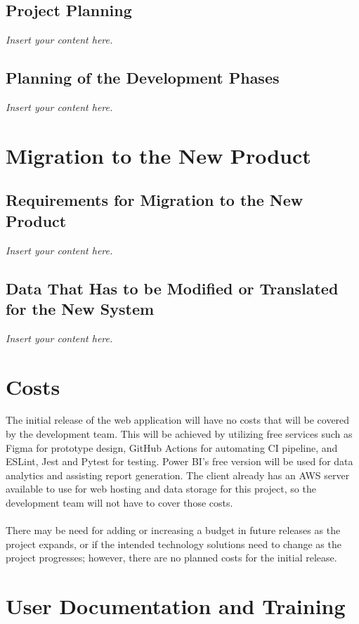 \documentclass[12pt]{article}
\newcommand{\lips}{\textit{Insert your content here.}}
\begin{document}
\subsection{Project Planning}
\lips
\subsection{Planning of the Development Phases}
\lips

\section{Migration to the New Product}
\subsection{Requirements for Migration to the New Product}
\lips
\subsection{Data That Has to be Modified or Translated for the New System}
\lips

\section{Costs}
\hspace{1.5em}The initial release of the web application will have no costs that will be covered by the development team. 
This will be achieved by utilizing free services such as Figma for prototype design, GitHub Actions for automating CI pipeline, and ESLint, Jest and Pytest 
for testing. Power BI's free version will be used for data analytics and assisting report generation. The client already has an AWS 
server available to use for web hosting and data storage for this project, so the development team will not have to cover those costs.
\\\\
\indent There may be need for adding or increasing a budget in future releases as the project expands, or if the intended
technology solutions need to change as the project progresses; however, there are no planned costs for the initial release.

\section{User Documentation and Training}
\end{document}
